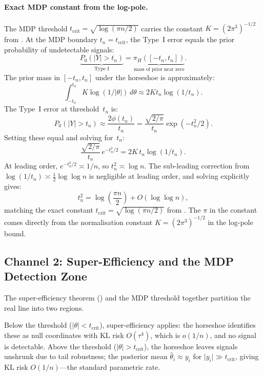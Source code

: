 \documentclass[12pt]{article}
\newcommand{\abs}[1]{\lvert #1 \rvert}
\newcommand{\piH}{\pi_H}
\newcommand{\tcrit}{t_{\mathrm{crit}}}
\begin{document}
\paragraph{Exact MDP constant from the log-pole.}
The MDP threshold $\tcrit = \sqrt{\log(\pi n/2)}$ carries the constant $K = (2\pi^3)^{-1/2}$ from . At the MDP boundary $t_n = \tcrit$, the Type~I error equals the prior probability of undetectable signals:
\begin{equation}\label{eq:equiboundary}
  \underbrace{P_0(\abs{Y} > t_n)}_{\text{Type~I}}
  = \underbrace{\piH([-t_n, t_n])}_{\text{mass of prior near zero}}.
\end{equation}
The prior mass in $[-t_n, t_n]$ under the horseshoe is approximately:
\[
  \int_{-t_n}^{t_n} K\log(1/\abs{\theta})\, d\theta
  \approx 2K t_n \log(1/t_n).
\]
The Type~I error at threshold~$t_n$ is:
\[
  P_0(\abs{Y} > t_n)
  \approx \frac{2\phi(t_n)}{t_n}
  = \frac{\sqrt{2/\pi}}{t_n}\exp(-t_n^2/2).
\]
Setting these equal and solving for~$t_n$:
\begin{equation}\label{eq:equiboundary-solve}
  \frac{\sqrt{2/\pi}}{t_n}\, e^{-t_n^2/2}
  = 2K\, t_n \log(1/t_n).
\end{equation}
At leading order, $e^{-t_n^2/2} \asymp 1/n$, so $t_n^2 \asymp \log n$. The sub-leading correction from $\log(1/t_n) \asymp \frac{1}{2}\log\log n$ is negligible at leading order, and solving explicitly gives:
\begin{equation}\label{eq:exact-threshold}
  t_n^2 = \log\!\left(\frac{\pi n}{2}\right) + O(\log\log n),
\end{equation}
matching the exact constant $\tcrit = \sqrt{\log(\pi n/2)}$ from \citet{datta2026newlook}. The $\pi$ in the constant comes directly from the normalisation constant $K = (2\pi^3)^{-1/2}$ in the log-pole bound.


\subsection{Channel 2: Super-Efficiency and the MDP Detection Zone}\label{sec:channel2}

The super-efficiency theorem () and the MDP threshold together partition the real line into two regions.

Below the threshold ($\abs{\theta} < \tcrit$), super-efficiency applies: the horseshoe identifies these as null coordinates with KL risk $O(\tau^4)$, which is $o(1/n)$, and no signal is detectable. Above the threshold ($\abs{\theta} > \tcrit$), the horseshoe leaves signals unshrunk due to tail robustness; the posterior mean $\hat{\theta}_i \approx y_i$ for $\abs{y_i} \gg \tcrit$, giving KL risk $O(1/n)$---the standard parametric rate.
\end{document}
